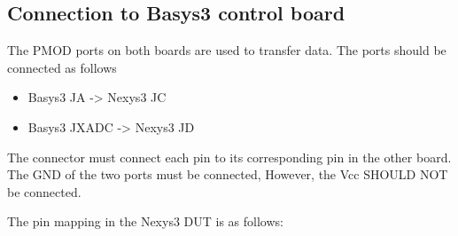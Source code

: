 \documentclass[letterpaper,10pt,english]{sphinxmanual}
\begin{document}
\subsection{Connection to Basys3 control board}
\label{\detokenize{dut_board_setup:connection-to-basys3-control-board}}
The PMOD ports on both boards are used to transfer data. The ports should be connected as follows
\begin{itemize}
\item {} 
Basys3 JA -\textgreater{} Nexys3 JC

\item {} 
Basys3 JXADC -\textgreater{} Nexys3 JD

\end{itemize}

The connector must connect each pin to its corresponding pin in the other board. The GND of the two
ports must be connected, However, the Vcc SHOULD NOT be connected.

The pin mapping in the Nexys3 DUT is as follows:
\end{document}
